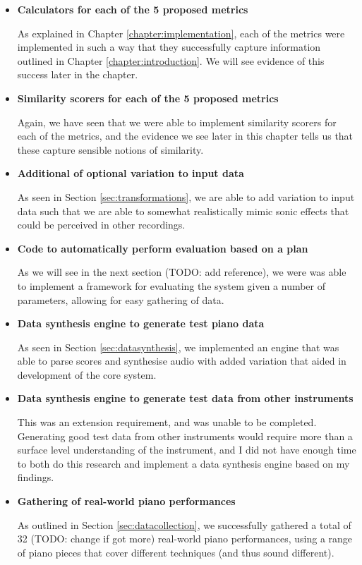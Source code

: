 \documentclass[oneside, class=book, 12pt, crop=false]{standalone}
\begin{document}
\begin{itemize}
  \item
    \textbf{Calculators for each of the 5 proposed metrics}

    As explained in Chapter \ref{chapter:implementation}, each of the metrics were implemented in such a way that they successfully capture information outlined in Chapter \ref{chapter:introduction}. We will see evidence of this success later in the chapter.

  \item
    \textbf{Similarity scorers for each of the 5 proposed metrics}

    Again, we have seen that we were able to implement similarity scorers for each of the metrics, and the evidence we see later in this chapter tells us that these capture sensible notions of similarity.

  \item
    \textbf{Additional of optional variation to input data}

    As seen in Section \ref{sec:transformations}, we are able to add variation to input data such that we are able to somewhat realistically mimic sonic effects that could be perceived in other recordings.

  \item
    \textbf{Code to automatically perform evaluation based on a plan}

    As we will see in the next section (TODO: add reference), we were was able to implement a framework for evaluating the system given a number of parameters, allowing for easy gathering of data.

  \item
    \textbf{Data synthesis engine to generate test piano data}

    As seen in Section \ref{sec:datasynthesis}, we implemented an engine that was able to parse scores and synthesise audio with added variation that aided in development of the core system.

  \item
    \textbf{Data synthesis engine to generate test data from other instruments}

    This was an extension requirement, and was unable to be completed. Generating good test data from other instruments would require more than a surface level understanding of the instrument, and I did not have enough time to both do this research and implement a data synthesis engine based on my findings.

  \item
    \textbf{Gathering of real-world piano performances}

    As outlined in Section \ref{sec:datacollection}, we successfully gathered a total of 32 (TODO: change if got more) real-world piano performances, using a range of piano pieces that cover different techniques (and thus sound different).
\end{itemize}
\end{document}

